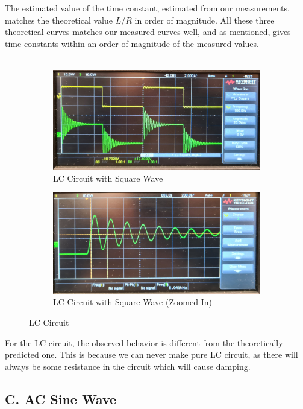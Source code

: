 \documentclass[a4paper,12pt]{article}
\begin{document}
The estimated value of the time constant, estimated from our measurements, matches the theoretical value $L/R$ in order of magnitude. 
All these three theoretical curves matches our measured curves well, and as mentioned, gives time constants within an order of magnitude of the measured values.
\\\\
\begin{figure}[H]
  \centering
  \begin{subfigure}{.5\textwidth}
    \centering
    \includegraphics[width=.9\linewidth]{../data/20211116_110612-mod.jpg}
    \caption{LC Circuit with Square Wave}
  \end{subfigure}%
  \begin{subfigure}{.5\textwidth}
    \centering
    \includegraphics[width=.9\linewidth]{../data/20211116_110834-mod.jpg}
    \caption{LC Circuit with Square Wave (Zoomed In)}
  \end{subfigure}
  \caption{LC Circuit}
\end{figure}

For the LC circuit, the observed behavior is different from the theoretically predicted one. This is because we 
can never make pure LC circuit, as there will always be some resistance in the circuit which will cause damping.

\subsection*{C. AC Sine Wave}
\end{document}
